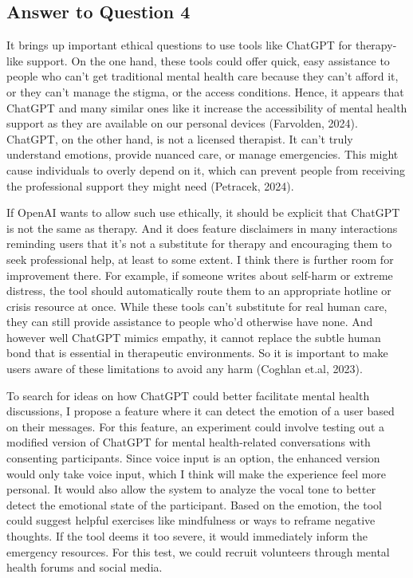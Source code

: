 \documentclass[
	letterpaper, %
]{jdf}
\begin{document}
\subsection{Answer to Question 4}
It brings up important ethical questions to use tools like ChatGPT for therapy-like support. On the one hand, these tools could offer quick, easy assistance to people who can’t get traditional mental health care because they can’t afford it, or they can’t manage the stigma, or the access conditions. Hence, it appears that ChatGPT and many similar ones like it increase the accessibility of mental health support as they are available on our personal devices (Farvolden, 2024). ChatGPT, on the other hand, is not a licensed therapist. It can’t truly understand emotions, provide nuanced care, or manage emergencies. This might cause individuals to overly depend on it, which can prevent people from receiving the professional support they might need (Petracek, 2024).

If OpenAI wants to allow such use ethically, it should be explicit that ChatGPT is not the same as therapy. And it does feature disclaimers in many interactions reminding users that it’s not a substitute for therapy and encouraging them to seek professional help, at least to some extent. I think there is further room for improvement there. For example, if someone writes about self-harm or extreme distress, the tool should automatically route them to an appropriate hotline or crisis resource at once. While these tools can’t substitute for real human care, they can still provide assistance to people who’d otherwise have none. And however well ChatGPT mimics empathy, it cannot replace the subtle human bond that is essential in therapeutic environments. So it is important to make users aware of these limitations to avoid any harm (Coghlan et.al, 2023).

To search for ideas on how ChatGPT could better facilitate mental health discussions, I propose a feature where it can detect the emotion of a user based on their messages. For this feature, an experiment could involve testing out a modified version of ChatGPT for mental health-related conversations with consenting participants. Since voice input is an option, the enhanced version would only take voice input, which I think will make the experience feel more personal. It would also allow the system to analyze the vocal tone to better detect the emotional state of the participant. Based on the emotion, the tool could suggest helpful exercises like mindfulness or ways to reframe negative thoughts. If the tool deems it too severe, it would immediately inform the emergency resources. For this test, we could recruit volunteers through mental health forums and social media.
\end{document}
